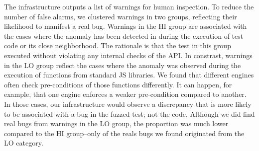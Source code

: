 \documentclass[10pt,conference,anonymous]{IEEEtran}
\begin{document}
The infrastructure outputs a list of warnings for human inspection.
To reduce the number of false alarms, we clustered warnings in two
groups, reflecting their likelihood to manifest a real bug. Warnings
in the HI group are associated with the cases where the anomaly has
been detected in during the execution of test code or its close
neighborhood. The rationale is that the test in this group executed
without violating any internal checks of the API. In constrast,
warnings in the LO group reflect the cases where the anomaly was
observed during the execution of functions from standard JS libraries.
  We found that different engines often check pre-conditions of
those functions differently. It can happen, for example, that one
engine enforces a weaker pre-condition compared to another.
In those cases, our infrastructure would observe a discrepancy that is more likely to
be associated with a bug in the fuzzed test; not the code. Although
we did find real bugs from warnings in the LO group, the proportion
was much lower compared to the HI group--only  of the reals bugs
we found originated from the LO category.


\end{document}
